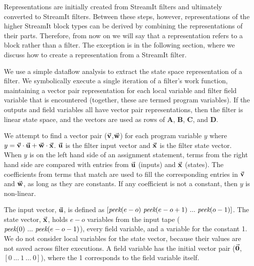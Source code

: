 Representations are initially created from StreamIt filters and
ultimately converted to StreamIt filters. Between these steps,
however, representations of the higher StreamIt block types can be
derived by combining the representations of their parts.  Therefore,
from now on we will say that a representation refers to a block rather
than a filter. The exception is in the following section, where we
discuss how to create a representation from a StreamIt filter.


We use a simple dataflow analysis to extract the state space
representation of a filter. We symbolically execute a single iteration
of a filter's work function, maintaining a vector pair representation
for each local variable and filter field variable that is encountered
(together, these are termed program variables). If the outputs and
field variables all have vector pair representations, then the filter
is linear state space, and the vectors are used as rows of
$\mathbf{A}$, $\mathbf{B}$, $\mathbf{C}$, and $\mathbf{D}$.

We attempt to find a vector pair
($\vec{\mathbf{v}}$,$\vec{\mathbf{w}}$) for each program variable $y$
where $y = \vec{\mathbf{v}} \cdot \vec{\mathbf{u}} +
\vec{\mathbf{w}} \cdot \vec{\mathbf{x}}$. $\vec{\mathbf{u}}$ is
the filter input vector and $\vec{\mathbf{x}}$ is the filter state
vector. When $y$ is on the left hand side of an assignment
statement, terms from the right hand side are compared with
entries from $\vec{\mathbf{u}}$ (inputs) and $\vec{\mathbf{x}}$
(states). The coefficients from terms that match are used to
fill the corresponding entries in $\vec{\mathbf{v}}$ and
$\vec{\mathbf{w}}$, as long as they are constants. If any
coefficient is not a constant, then $y$ is non-linear.

The input vector, $\vec{\mathbf{u}}$, is defined as $[\mbox{\it peek}(e-o)
~\mbox{\it peek}(e-o+1) ~... ~\mbox{\it peek}(o-1)]$. The state vector,
$\vec{\mathbf{x}}$, holds $e-o$ variables from the input tape
($\mbox{\it peek}(0) ~... ~\mbox{\it peek}(e-o-1)$), every field variable, and a
variable for the constant 1. We do not consider local variables
for the state vector, because their values are not saved across
filter executions. 
A field variable has the initial vector pair ($\vec{\mathbf{0}}$,$[ 0 ~...~ 1 ~...~ 0 ]$), where the 1 corresponds to the field variable itself.

